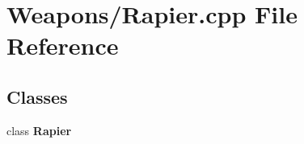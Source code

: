 \section{Weapons/\-Rapier.cpp File Reference}
\label{_rapier_8cpp}
\subsection*{Classes}
\begin{DoxyCompactItemize}
\item 
class {\bf Rapier}
\end{DoxyCompactItemize}
